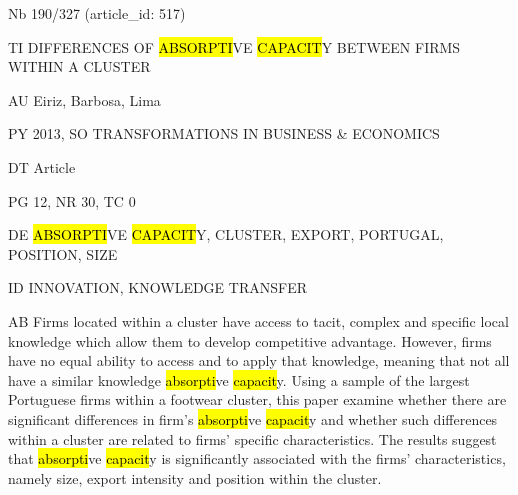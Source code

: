 \documentclass[a4paper]{article}
\begin{document}
\vspace*{-2cm}
Nb \tabto{0cm}190/327 (article\_id: 517)\par
TI \tabto{0cm}DIFFERENCES OF \hl{ABSORPTI}VE \hl{CAPACIT}Y BETWEEN FIRMS WITHIN A CLUSTER\par
AU \tabto{0cm}Eiriz, Barbosa, Lima\par
PY \tabto{0cm}2013, SO TRANSFORMATIONS IN BUSINESS \& ECONOMICS\par
DT \tabto{0cm}Article\par
PG \tabto{0cm}12, NR 30, TC 0\par
DE \tabto{0cm}\hl{ABSORPTI}VE \hl{CAPACIT}Y, CLUSTER, EXPORT, PORTUGAL, POSITION, SIZE\par
ID \tabto{0cm}INNOVATION, KNOWLEDGE TRANSFER\par
AB \tabto{0cm}Firms located within a cluster have access to tacit, complex and specific local knowledge which allow them to develop competitive advantage. However, firms have no equal ability to access and to apply that knowledge, meaning that not all have a similar knowledge \hl{absorpti}ve \hl{capacit}y. Using a sample of the largest Portuguese firms within a footwear cluster, this paper examine whether there are significant differences in firm's \hl{absorpti}ve \hl{capacit}y and whether such differences within a cluster are related to firms' specific characteristics. The results suggest that \hl{absorpti}ve \hl{capacit}y is significantly associated with the firms' characteristics, namely size, export intensity and position within the cluster.\par
\clearpage
\end{document}
